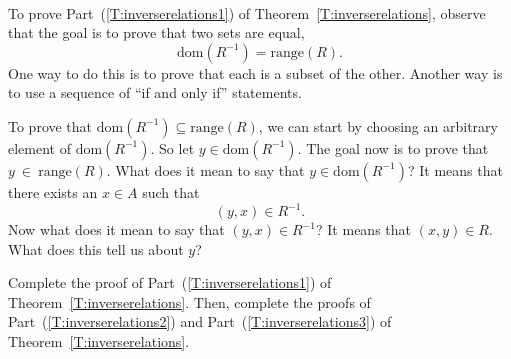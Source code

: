 \hbreak
%
\begin{activity} \label{A:provinginverse} \hfill \\
To prove Part~(\ref{T:inverserelations1}) of 
Theorem~\ref{T:inverserelations}, observe that the goal is to prove that two sets are equal, 
\[
\text{dom}\!\left( {R^{ - 1} } \right) = \text{range}( R )\!.
\]
One way to do this is to prove that each is a subset of the other.  Another way is to use a sequence of  ``if and only if'' statements.

To prove that  $\text{dom}\!\left( {R^{ - 1} } \right) \subseteq \text{range}( R )$, we can start by choosing an arbitrary element of  $\text{dom}\!\left( {R^{ - 1} } \right)$.  So let  
$y \in \text{dom}\!\left( {R^{ - 1} } \right)$.  The goal now is to prove that 
$y~\in~\text{range}( R )$.  What does it mean to say that  
$y \in \text{dom}\!\left( {R^{ - 1} } \right)$?  It means that there exists an  $x \in A$  such that
\[
\left( {y, x} \right) \in R^{ - 1}. 
\]
Now what does it mean to say that  $( {y, x} ) \in R^{ - 1} $?  It means that  
$( {x, y} ) \in R$.  What does this tell us about  $y$?

Complete the proof of Part~(\ref{T:inverserelations1}) of Theorem~\ref{T:inverserelations}.  Then, complete the proofs of Part~(\ref{T:inverserelations2}) and Part~(\ref{T:inverserelations3}) of Theorem~\ref{T:inverserelations}.
\end{activity}
\hbreak

\endinput


  



























